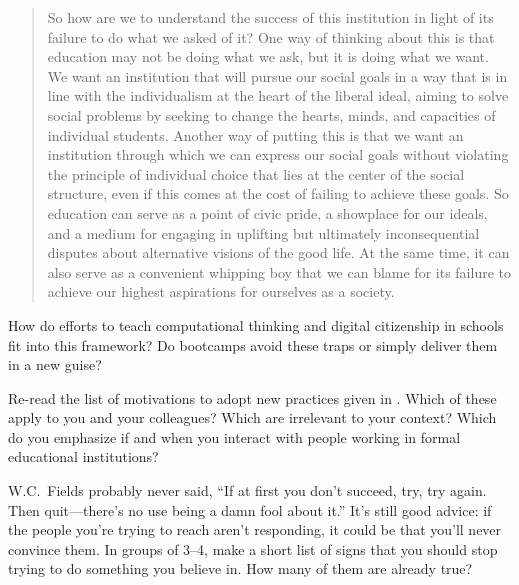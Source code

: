 \begin{quote}

  So how are we to understand the success of this institution
  in light of its failure to do what we asked of it?
  One way of thinking about this is that
  education may not be doing what we ask,
  but it is doing what we want.
  We want an institution that will pursue our social goals
  in a way that is in line with the individualism at the heart of the liberal ideal,
  aiming to solve social problems
  by seeking to change the hearts, minds, and capacities of individual students.
  Another way of putting this is that
  we want an institution through which we can express our social goals
  without violating the principle of individual choice
  that lies at the center of the social structure,
  even if this comes at the cost of failing to achieve these goals.
  So education can serve as a point of civic pride,
  a showplace for our ideals,
  and a medium for engaging in uplifting but ultimately inconsequential disputes
  about alternative visions of the good life.
  At the same time,
  it can also serve as a convenient whipping boy
  that we can blame for its failure to achieve our highest aspirations for ourselves as a society.

\end{quote}

How do efforts to teach computational thinking and digital citizenship in schools
fit into this framework?
Do bootcamps avoid these traps or simply deliver them in a new guise?


Re-read the list of motivations to adopt new practices
given in .
Which of these apply to you and your colleagues?
Which are irrelevant to your context?
Which do you emphasize
if and when you interact with people working in formal educational institutions?


W.C.~Fields probably never said,
``If at first you don't succeed, try, try again.
Then quit---there's no use being a damn fool about it.''
It's still good advice:
if the people you're trying to reach aren't responding,
it could be that you'll never convince them.
In groups of 3--4,
make a short list of signs that you should stop trying to do something you believe in.
How many of them are already true?


